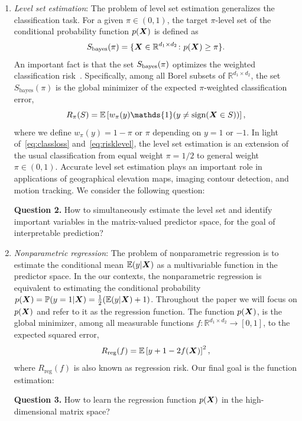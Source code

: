 \documentclass[11pt]{article}
\theoremstyle{plain}
\theoremstyle{definition}
\def\sign{\textup{sign}}
\def\bayesS{S_{\textup{bayes}}}
\begin{document}
\begin{enumerate}[label={2.\arabic*},wide, labelwidth=!, labelindent=0pt]
\item {\it Level set estimation}: The problem of level set estimation generalizes the classification task. For a given $\pi\in(0, 1)$, the target $\pi$-level set of the conditional probability function $p(\bm X)$ is defined as
\begin{equation}\label{eq:level}
\bayesS(\pi) = \{\mX\in\mathbb{R}^{d_1\times d_2}\colon p(\mX)\geq \pi\}.
\end{equation}
An important fact is that the set $\bayesS(\pi)$ optimizes the weighted classification risk~\citep{willett2007minimax,scott2007regression,wang2008probability}. Specifically, among all Borel subsets of $\mathbb{R}^{d_1\times d_2}$, the set $S_{\text{bayes}}(\pi)$ is the global minimizer of the expected $\pi$-weighted classification error,
\begin{equation}\label{eq:risklevel}
R_\pi(S)=\mathbb{E}\left[ w_{\pi}(y)\mathds{1}(y\neq \sign(\mX\in S))\right],
\end{equation}
where we define $w_{\pi}(y)=1-\pi$ or $\pi$ depending on $y=1$ or $-1$. In light of~\eqref{eq:classloss} and~\eqref{eq:risklevel}, the level set estimation is an extension of the usual classification from equal weight $\pi=1/2$ to general weight $\pi \in(0,1)$. Accurate level set estimation plays an important role in applications of geographical elevation maps, imaging contour detection, and motion tracking. We consider the following question:

{\bf Question 2.} How to simultaneously estimate the level set and identify important variables in the matrix-valued predictor space, for the goal of interpretable prediction?


\item {\it Nonparametric regression}: The problem of nonparametric regression is to estimate the conditional mean $\mathbb{E}(y|\bm X)$ as a multivariable function in the predictor space. In the our contexts, the nonparametric regression is equivalent to estimating the conditional probability $p(\bm X)=\mathbb{P}(y=1|\bm X)=\frac{1}{2}(\mathbb{E}(y|\bm X)+1)$. Throughout the paper we will focus on $p(\bm X)$ and refer to it as the regression function. 
The function $p(\bm X)$, is the global minimizer, among all measurable functions $f\colon \mathbb{R}^{d_1\times d_2}\to[0,1]$, to the expected squared error,
\begin{equation}\label{eq:regression}
R_{\text{reg}}(f)=\mathbb{E}\left[y+1-2f(\bm X)\right]^2,
\end{equation}
where $R_{\text{reg}}(f)$ is also known as regression risk. Our final goal is the function estimation:

{\bf Question 3.} How to learn the regression function $p(\bm X)$ in the high-dimensional matrix space?
\end{enumerate}
\end{document}
